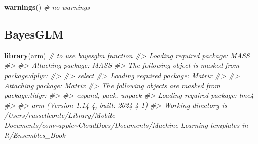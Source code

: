 \documentclass[
]{book}
\newenvironment{Shaded}{\begin{snugshade}}{\end{snugshade}}
\newcommand{\CommentTok}[1]{\textcolor[rgb]{0.56,0.35,0.01}{\textit{#1}}}
\newcommand{\FunctionTok}[1]{\textcolor[rgb]{0.13,0.29,0.53}{\textbf{#1}}}
\newcommand{\NormalTok}[1]{#1}
\begin{document}
\begin{Shaded}
\begin{Highlighting}[]
\FunctionTok{warnings}\NormalTok{() }\CommentTok{\# no warnings}
\end{Highlighting}
\end{Shaded}

\subsection{BayesGLM}\label{bayesglm}

\begin{Shaded}
\begin{Highlighting}[]
\FunctionTok{library}\NormalTok{(arm) }\CommentTok{\# to use bayesglm function}
\CommentTok{\#\textgreater{} Loading required package: MASS}
\CommentTok{\#\textgreater{} }
\CommentTok{\#\textgreater{} Attaching package: \textquotesingle{}MASS\textquotesingle{}}
\CommentTok{\#\textgreater{} The following object is masked from \textquotesingle{}package:dplyr\textquotesingle{}:}
\CommentTok{\#\textgreater{} }
\CommentTok{\#\textgreater{}     select}
\CommentTok{\#\textgreater{} Loading required package: Matrix}
\CommentTok{\#\textgreater{} }
\CommentTok{\#\textgreater{} Attaching package: \textquotesingle{}Matrix\textquotesingle{}}
\CommentTok{\#\textgreater{} The following objects are masked from \textquotesingle{}package:tidyr\textquotesingle{}:}
\CommentTok{\#\textgreater{} }
\CommentTok{\#\textgreater{}     expand, pack, unpack}
\CommentTok{\#\textgreater{} Loading required package: lme4}
\CommentTok{\#\textgreater{} }
\CommentTok{\#\textgreater{} arm (Version 1.14{-}4, built: 2024{-}4{-}1)}
\CommentTok{\#\textgreater{} Working directory is /Users/russellconte/Library/Mobile Documents/com\textasciitilde{}apple\textasciitilde{}CloudDocs/Documents/Machine Learning templates in R/Ensembles\_Book}
\end{Highlighting}
\end{Shaded}
\end{document}
